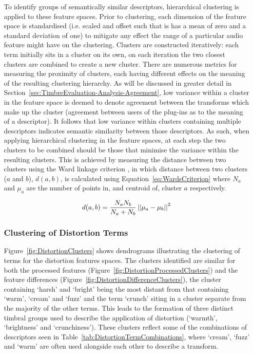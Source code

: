 		To identify groups of semantically similar descriptors, hierarchical clustering is applied to these feature
		spaces. Prior to clustering, each dimension of the feature space is standardised (i.e. scaled and offset
		such that is has a mean of zero and a standard deviation of one) to mitigate any effect the range of a
		particular audio feature might have on the clustering. Clusters are constructed iteratively: each term
		initially sits in a cluster on its own, on each iteration the two closest clusters are combined to create a
		new cluster. There are numerous metrics for measuring the proximity of clusters, each having different
		effects on the meaning of the resulting clustering hierarchy. As will be discussed in greater detail in
		Section~\ref{sec:TimbreEvaluation-Analysis-Agreement}, low variance within a cluster in the feature space
		is deemed to denote agreement between the transforms which make up the cluster (agreement between users of
		the plug-ins as to the meaning of a descriptor). It follows that low variance within clusters containing
		multiple descriptors indicates semantic similarity between those descriptors. As such, when applying
		hierarchical clustering in the feature spaces, at each step the two clusters to be combined should be those
		that minimise the variance within the resulting clusters. This is achieved by measuring the distance
		between two clusters using the Ward linkage criterion \citep{ward1963hierarchical}, in which distance
		between two clusters ($a$ and $b$), $d(a, b)$, is calculated using Equation~\ref{eq:WardsCriterion} where
		$N_{a}$ and $\mu_{a}$ are the number of points in, and centroid of, cluster $a$ respectively.

		\begin{equation}
			d(a, b) = \frac{N_{a}N_{b}}{N_{a} + N_{b}} \left|\left|\mu_{a} - \mu_{b}\right|\right|^{2}
			\label{eq:WardsCriterion}
		\end{equation}

		\subsubsection*{Clustering of Distortion Terms}
			Figure~\ref{fig:DistortionClusters} shows dendrograms illustrating the clustering of terms for the
			distortion features spaces. The clusters identified are similar for both the processed features
			(Figure~\ref{fig:DistortionProcessedClusters}) and the feature differences
			(Figure~\ref{fig:DistortionDifferenceClusters}), the cluster containing `harsh' and `bright' being
			the most distant from that containing `warm', `cream' and `fuzz' and the term `crunch' siting in a
			cluster separate from the majority of the other terms. This leads to the formation of three
			distinct timbral groups used to describe the application of distortion (`warmth', `brightness' and
			`crunchiness'). These clusters reflect some of the combinations of descriptors seen in
			Table~\ref{tab:DistortionTermCombinations}, where `cream', `fuzz' and `warm' are often used
			alongside each other to describe a transform.

